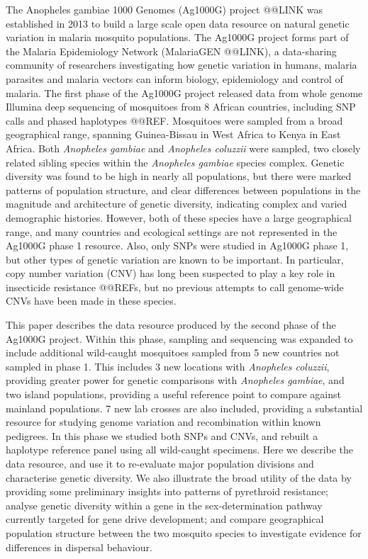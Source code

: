 \documentclass[a4paper,11pt,abstracton,hidelinks]{scrartcl}
\begin{document}
%
The Anopheles gambiae 1000 Genomes (Ag1000G) project @@LINK was established in 2013 to build a large scale open data resource on natural genetic variation in malaria mosquito populations.
%
The Ag1000G project forms part of the Malaria Epidemiology Network (MalariaGEN @@LINK), a data-sharing community of researchers investigating how genetic variation in humans, malaria parasites and malaria vectors can inform biology, epidemiology and control of malaria.
%
The first phase of the Ag1000G project released data from whole genome Illumina deep sequencing of mosquitoes from 8 African countries, including SNP calls and phased haplotypes @@REF.
%
Mosquitoes were sampled from a broad geographical range, spanning Guinea-Bissau in West Africa to Kenya in East Africa.
%
Both \textit{Anopheles gambiae} and \textit{Anopheles coluzzii} were sampled, two closely related sibling species within the \textit{Anopheles gambiae} species complex.
%
Genetic diversity was found to be high in nearly all populations, but there were marked patterns of population structure, and clear differences between populations in the magnitude and architecture of genetic diversity, indicating complex and varied demographic histories.
%
However, both of these species have a large geographical range, and many countries and ecological settings are not represented in the Ag1000G phase 1 resource.
%
Also, only SNPs were studied in Ag1000G phase 1, but other types of genetic variation are known to be important.
%
In particular, copy number variation (CNV) has long been suspected to play a key role in insecticide resistance @@REFs, but no previous attempts to call genome-wide CNVs have been made in these species.


%
This paper describes the data resource produced by the second phase of the Ag1000G project.
%
Within this phase, sampling and sequencing was expanded to include additional wild-caught mosquitoes sampled from 5 new countries not sampled in phase 1.
%
This includes 3 new locations with \textit{Anopheles coluzzii}, providing greater power for genetic comparisons with \textit{Anopheles gambiae}, and two island populations, providing a useful reference point to compare against mainland populations.
%
7 new lab crosses are also included, providing a substantial resource for studying genome variation and recombination within known pedigrees.
%
In this phase we studied both SNPs and CNVs, and rebuilt a haplotype reference panel using all wild-caught specimens.
%
Here we describe the data resource, and use it to re-evaluate major population divisions and characterise genetic diversity.
%
We also illustrate the broad utility of the data by providing some preliminary insights into patterns of pyrethroid resistance; analyse genetic diversity within a gene in the sex-determination pathway currently targeted for gene drive development; and compare geographical population structure between the two mosquito species to investigate evidence for differences in dispersal behaviour.
\end{document}
